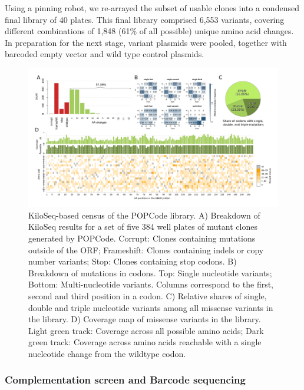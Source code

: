 Using a pinning robot, we re-arrayed the subset of usable clones into a condensed final library of 40 plates. This final library comprised 6,553  variants, covering different combinations of 1,848 (61\% of all possible) unique amino acid changes. In preparation for the next stage, variant plasmids were pooled, together with barcoded empty vector and wild type control plasmids.

\begin{landscape}
\begin{figure}[h]
	\centering
	\includegraphics[width=9in]{img/popcode_census.pdf}
	\caption{KiloSeq-based census of the  POPCode library. A) Breakdown of KiloSeq results for a set of five 384 well plates of mutant clones generated by POPCode. Corrupt: Clones containing mutations outside of the ORF; Frameshift: Clones containing indels or copy number variants; Stop: Clones containing stop codons. B) Breakdown of mutations in codons. Top: Single nucleotide variants; Bottom: Multi-nucleotide variants. Columns correspond to the first, second and third position in a codon. C) Relative shares of single, double and triple nucleotide variants among all missense variants in the library. D) Coverage map of missense variants in the library. Light green track: Coverage across all possible amino acids; Dark green track: Coverage across amino acids reachable with a single nucleotide change from the wildtype codon.}
	\label{fig:popcode_census}
\end{figure}
\end{landscape}



\subsubsection{Complementation screen and Barcode sequencing}


